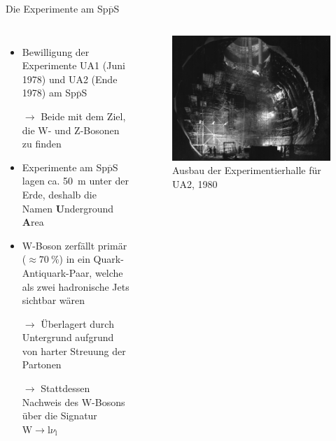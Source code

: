 \documentclass[aspectratio=1610, professionalfonts, 10pt]{beamer}
\begin{document}
\begin{frame}{Die Experimente am Sp$\overline{\text{p}}$S}
	\begin{columns}
				\begin{itemize}
					\setlength\itemsep{0.5em}
					\item Bewilligung der Experimente UA1 (Juni 1978) und UA2 (Ende 1978) am Sp$\overline{\text{p}}$S
					\item[$\rightarrow$] Beide mit dem Ziel, die W- und Z-Bosonen zu finden
					\item Experimente am Sp$\overline{\text{p}}$S lagen ca. \SI{50}{\metre} unter der Erde, deshalb die Namen \textbf{U}nderground \textbf{A}rea
					\item W-Boson zerfällt primär ($\approx \SI{70}{\percent}$) in ein Quark-Antiquark-Paar, welche als zwei hadronische Jets sichtbar wären
					\item[$\rightarrow$] Überlagert durch Untergrund aufgrund von harter Streuung der Partonen
					\item[$\rightarrow$] Stattdessen Nachweis des W-Bosons über die Signatur $\text{W} \rightarrow \text{l} \nu_\text{l}$
				\end{itemize}
			\begin{figure}
	  			\centering
				\includegraphics[width=\linewidth]{Images/8002262.jpg}
				\caption{Ausbau der Experimentierhalle für UA2, 1980 \cite{CERN-PHOTO-8002262}}
	  			\label{fig:sad}
			\end{figure}
	\end{columns}
\end{frame}
\end{document}

